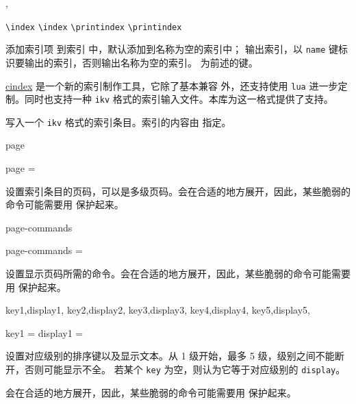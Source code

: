 \documentclass{cusdoc}
\begin{document}
\begin{function}{\index,\printindex}
  \begin{syntax}
    \verb|\index| 
    \verb|\index|  
    \verb|\printindex|
    \verb|\printindex| 
  \end{syntax}
 添加索引项  到索引  中，默认添加到名称为空的索引中； 输出索引，以 \texttt{name} 键标识要输出的索引，否则输出名称为空的索引。 为前述的键。
\end{function}

\href{https://github.com/Sophanatprime/cindex}{cindex} 是一个新的索引制作工具，它除了基本兼容  外，还支持使用 \texttt{lua} 进一步定制。同时也支持一种 \texttt{ikv} 格式的索引输入文件。本库为这一格式提供了支持。

\begin{function}{\kvindex}
  \begin{syntax}
    \V\kvindex {} 
  \end{syntax}
写入一个 \texttt{ikv} 格式的索引条目。索引的内容由  指定。
\end{function}

\begin{keyval}[path=index-kv]{page}
  \begin{syntax}
    page = 
  \end{syntax}
设置索引条目的页码，可以是多级页码。会在合适的地方展开，因此，某些脆弱的命令可能需要用  保护起来。
\end{keyval}

\begin{keyval}[path=index-kv]{page-commands}
  \begin{syntax}
    page-commands = 
  \end{syntax}
设置显示页码所需的命令。会在合适的地方展开，因此，某些脆弱的命令可能需要用  保护起来。
\end{keyval}

\begin{keyval}[path=index-kv]{
  key1,display1,
  key2,display2,
  key3,display3,
  key4,display4,
  key5,display5,
}
  \begin{syntax}
    key1     = 
    display1 = 
  \end{syntax}
设置对应级别的排序键以及显示文本。从 1 级开始，最多 5 级，级别之间不能断开，否则可能显示不全。
若某个 \texttt{key} 为空，则认为它等于对应级别的 \texttt{display}。

会在合适的地方展开，因此，某些脆弱的命令可能需要用  保护起来。
\end{keyval}
\end{document}
